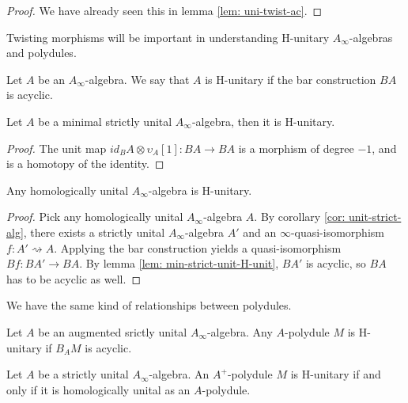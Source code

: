 \documentclass[../thesis.tex]{subfiles}
\begin{document}
            \begin{proof}
                We have already seen this in lemma \ref{lem: uni-twist-ac}.
            \end{proof}

            Twisting morphisms will be important in understanding H-unitary $A_\infty$-algebras and polydules.

            \begin{definition}
                Let $A$ be an $A_\infty$-algebra. We say that $A$ is H-unitary if the bar construction $BA$ is acyclic.
            \end{definition}

            \begin{lemma}\label{lem: min-unit-strict-H-unit}
                Let $A$ be a minimal strictly unital $A_\infty$-algebra, then it is H-unitary.
            \end{lemma}

            \begin{proof}
                The unit map $id_BA \otimes \upsilon_A[1] : BA \rightarrow BA$ is a morphism of degree $-1$, and is a homotopy of the identity.
            \end{proof}

            \begin{corollary}\label{cor: hu-to-H-u}
                Any homologically unital $A_\infty$-algebra is H-unitary. 
            \end{corollary}

            \begin{proof}
                Pick any homologically unital $A_\infty$-algebra $A$. By corollary \ref{cor: unit-strict-alg}, there exists a strictly unital $A_\infty$-algebra $A'$ and an $\infty$-quasi-isomorphism $f: A' \rightsquigarrow A$. Applying the bar construction yields a quasi-isomorphism $Bf : BA' \rightarrow BA$. By lemma \ref{lem: min-strict-unit-H-unit}, $BA'$ is acyclic, so $BA$ has to be acyclic as well.
            \end{proof}

            We have the same kind of relationships between polydules.

            \begin{definition}
                Let $A$ be an augmented srictly unital $A_\infty$-algebra. Any $A$-polydule $M$ is H-unitary if $B_AM$ is acyclic.
            \end{definition}

            \begin{lemma}\label{lem: H-u-is-hu}
                Let $A$ be a strictly unital $A_\infty$-algebra. An $A^+$-polydule $M$ is H-unitary if and only if it is homologically unital as an $A$-polydule.
            \end{lemma}
\end{document}
